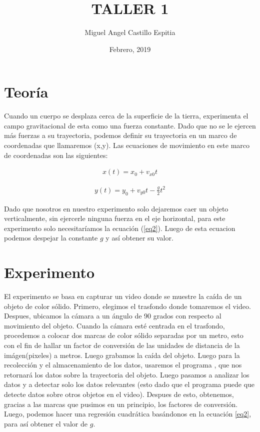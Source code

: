 \documentclass[12pt]{article}
\begin{document}
\title{TALLER 1}
\author{Miguel Angel Castillo Espitia}
\date{Febrero, 2019}
\maketitle


\section{Teoría}

Cuando un cuerpo se desplaza cerca de la superficie de la tierra, experimenta el campo gravitacional de esta como una fuerza constante. Dado que no se le ejercen más fuerzas a su trayectoria, podemos definir su trayectoria en un marco de coordenadas que llamaremos (x,y). Las ecuaciones de movimiento en este marco de coordenadas son las siguientes:\



\begin{equation}
  \begin{aligned}
	  {x(t)}={x}_{0}+{v}_{x0}{t}
	  \label{eq1}
  \end{aligned}
\end{equation}

\begin{equation}
  \begin{gathered}
	  {y(t)}={y}_{0}+{v}_{y0}{t}-\frac{g}{2}{t^{2}}
	  \label{eq2}
  \end{gathered}
\end{equation}

Dado que nosotros en nuestro experimento solo dejaremos caer un objeto verticalmente, sin ejercerle ninguna fuerza en el eje horizontal, para este experimento solo necesitaríamos la ecuación (\ref{eq2}). Luego de esta ecuacion podemos despejar la constante $\textstyle{g}$  y así obtener su valor.

\section{Experimento}

El experimento se basa en capturar un video donde se muestre la caída de un objeto de color sólido. Primero, elegimos el trasfondo donde tomaremos el video. Despues, ubicamos la cámara a un ángulo de 90 grados con respecto al movimiento del objeto. Cuando la cámara esté centrada en el trasfondo, procedemos a colocar dos marcas de color sólido separadas por un metro, esto con el fin de hallar un factor de conversión de las unidades de distancia de la imágen(pixeles) a metros. Luego grabamos la caída del objeto.
Luego para la recolección y el almacenamiento de los datos, usaremos el programa , \rmfamily que nos retornará los datos sobre la trayectoria del objeto. Luego pasamos a analizar los datos y a detectar solo los datos relevantes (esto dado que el programa puede que detecte datos sobre otros objetos en el video). Despues de esto, obtenemos, gracias a las marcas que pusimos en un principio, los factores de conversión. Luego, podemos hacer una regresión cuadrática basándonos en la ecuación \ref{eq2}, para así obtener el valor   de $\textstyle{g}$. 
\end{document}

